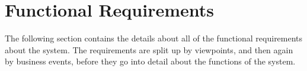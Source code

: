 \documentclass[]{article}
\begin{document}

\section{Functional Requirements}
\label{sec:functional_requirements}
The following section contains the details about all of the functional requirements about the system. The requirements are split up by viewpoints, and then again by business events, before they go into detail about the functions of the system.\\ 


\end{document}
